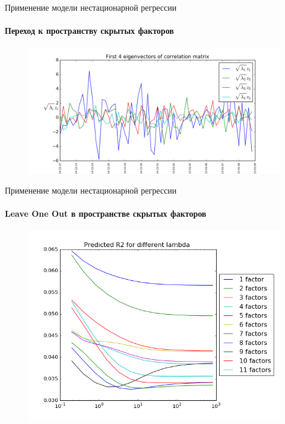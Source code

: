 \documentclass[11pt]{beamer}
\begin{document}
\begin{frame}{Применение модели нестационарной регрессии}
\framesubtitle{Переход к пространству скрытых факторов}
\begin{figure}
\centering
\includegraphics[scale=0.5]{eigvecs.png}\\
\end{figure}
\end{frame}


\begin{frame}{Применение модели нестационарной регрессии}
\framesubtitle{Leave One Out в пространстве скрытых факторов}
\begin{figure}
\centering
\includegraphics[scale=0.4]{looeig_r2.png}
\end{figure}
\end{frame}
\end{document}
